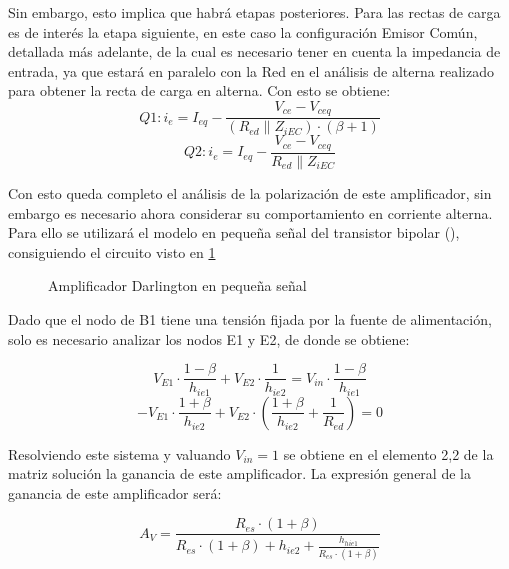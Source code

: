 Sin embargo, esto implica que habrá etapas posteriores. Para las rectas de carga es de interés la etapa siguiente, en este caso la configuración Emisor Común, detallada más adelante, de la cual es necesario tener en cuenta la impedancia de entrada, ya que estará en paralelo con la Red en el análisis de alterna realizado para obtener la recta de carga en alterna. Con esto se obtiene: 
\begin{equation}
    Q1: i_e = I_{eq} - \frac{V_{ce}-V_{ceq}}{(R_{ed}\parallel Z_{iEC}) \cdot (\beta + 1)}
    \label{Carga_aQ1}
\end{equation}
\begin{equation}
    Q2: i_e = I_{eq} - \frac{V_{ce}-V_{ceq}}{R_{ed} \parallel Z_{iEC}}
    \label{Carga_aQ2}
\end{equation}

Con esto queda completo el análisis de la polarización de este amplificador, sin embargo es necesario ahora considerar su comportamiento en corriente alterna. Para ello se utilizará el modelo en pequeña señal del transistor bipolar (\cite[p.~274]{Schilling3ed}), consiguiendo el circuito visto en \cref{fig:Dar_PS}

\begin{figure}[H]
    \centering
    
    \caption{Amplificador Darlington en pequeña señal}
    \label{fig:Dar_PS}
\end{figure}

Dado que el nodo de B1 tiene una tensión fijada por la fuente de alimentación, solo es necesario analizar los nodos E1 y E2, de donde se obtiene:

\begin{equation}
    V_{E1} \cdot \frac{1-\beta}{h_{ie1}} + V_{E2} \cdot \frac{1}{h_{ie2}} = V_{in} \cdot \frac{1-\beta}{h_{ie1}}
    \label{Nodo_V1_D}
\end{equation}
\begin{equation}
    -V_{E1}\cdot \frac{1+\beta}{h_{ie2}} + V_{E2} \cdot (\frac{1+\beta}{h_{ie2}} + \frac{1}{R_{ed}}) = 0
    \label{Nodo_V2_D}    
\end{equation}

Resolviendo este sistema y valuando $V_{in} = 1$ se obtiene en el elemento 2,2 de la matriz solución la ganancia de este amplificador. La expresión general de la ganancia de este amplificador será:

\begin{equation}
  A_V = \frac{R_{es}\cdot(1+\beta)}{R_{es}\cdot(1+\beta)+h_{ie2}+\frac{h_{hie1}}{R_{es}\cdot(1+\beta)}}
  \label{AvDAr}
\end{equation}

